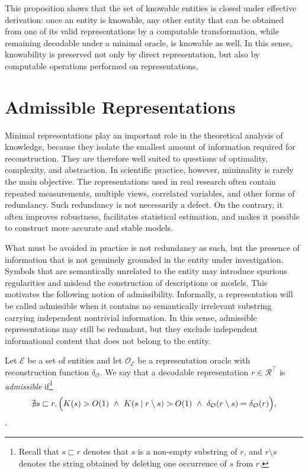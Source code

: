 This proposition shows that the set of knowable entities is closed under effective derivation: once an entity is knowable, any other entity that can be obtained from one of its valid representations by a computable transformation, while remaining decodable under a minimal oracle, is knowable as well. In this sense, knowability is preserved not only by direct representation, but also by computable operations performed on representations.

%
%

\section{Admissible Representations}
\label{sec:admissible_representations}

Minimal representations play an important role in the theoretical analysis of knowledge, because they isolate the smallest amount of information required for reconstruction. They are therefore well suited to questions of optimality, complexity, and abstraction. In scientific practice, however, minimality is rarely the main objective. The representations used in real research often contain repeated measurements, multiple views, correlated variables, and other forms of redundancy. Such redundancy is not necessarily a defect. On the contrary, it often improves robustness, facilitates statistical estimation, and makes it possible to construct more accurate and stable models.

What must be avoided in practice is not redundancy as such, but the presence of information that is not genuinely grounded in the entity under investigation. Symbols that are semantically unrelated to the entity may introduce spurious regularities and mislead the construction of descriptions or models. This motivates the following notion of admissibility. Informally, a representation will be called admissible when it contains no semantically irrelevant substring carrying independent nontrivial information. In this sense, admissible representations may still be redundant, but they exclude independent informational content that does not belong to the entity.

\begin{definition}
Let $\mathcal{E}$ be a set of entities and let $\mathcal{O}_{\mathcal{E}}$ be a representation oracle with reconstruction function $\delta_{\mathcal O}$. We say that a decodable representation $r \in \mathcal{R}^{\top}$ is \emph{admissible} if\footnote{Recall that $s\sqsubset r$ denotes that $s$ is a non-empty substring of $r$, and $r\setminus s$ denotes the string obtained by deleting one occurrence of $s$
from $r$.}
\[
\nexists s\sqsubset r,\Bigl(
K(s)>O(1)\ \land\ K(s\mid r\setminus s)>O(1)\ \land\
\delta_{\mathcal O}(r\setminus s)=\delta_{\mathcal O}(r)
\Bigr),
\].
\end{definition}

